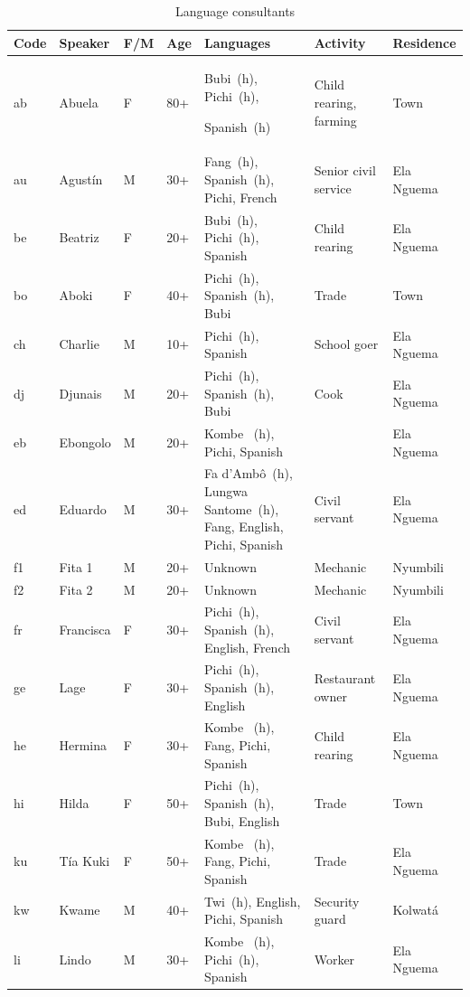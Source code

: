 \begin{longtable}{>{\footnotesize}l@{~}>{\footnotesize}l@{~} >{\footnotesize}l@{~}>{\footnotesize}l >{\footnotesize\raggedright}p{3cm} >{\footnotesize\raggedright}p{2cm} >{\footnotesize}l}
\caption{Language consultants}\label{tab:1:1.1}
\\
\lsptoprule

Code & Speaker & F/M & Age & Languages & Activity & Residence\\
\midrule\endhead
ab & Abuela & \textsc{F} & 80+ & Bubi~(h), Pichi~(h), 

Spanish~(h) & Child rearing, farming & Town\\
au & Agustín & M & 30+ & Fang~(h), Spanish~(h), Pichi, French & Senior civil service & Ela Nguema\\
be & Beatriz & \textsc{F} & 20+ & Bubi~(h), Pichi~(h), Spanish & Child rearing & Ela Nguema\\
bo & Aboki & \textsc{F} & 40+ & Pichi~(h), Spanish~(h), Bubi & Trade & Town\\
ch & Charlie & M & 10+ & Pichi~(h), Spanish & School goer & Ela Nguema\\
dj & Djunais & M & 20+ & Pichi~(h), Spanish~(h), Bubi & Cook & Ela Nguema\\
eb & Ebongolo & M & 20+ & Kombe ~(h), Pichi, Spanish &  & Ela Nguema\\
ed & Eduardo & M & 30+ & Fa d’Ambô~(h), Lungwa Santome~(h), Fang, English, Pichi, Spanish & Civil servant & Ela Nguema\\
f1 & Fita 1 & M & 20+ & Unknown & Mechanic & Nyumbili\\
f2 & Fita 2 & M & 20+ & Unknown & Mechanic & Nyumbili\\
fr & Francisca & \textsc{F} & 30+ & Pichi~(h), Spanish~(h), English, French & Civil servant & Ela Nguema\\
ge & Lage & \textsc{F} & 30+ & Pichi~(h), Spanish~(h), English & Restaurant owner & Ela Nguema\\
he & Hermina & \textsc{F} & 30+ & Kombe ~(h), Fang, Pichi, Spanish & Child rearing & Ela Nguema\\
hi & Hilda & \textsc{F} & 50+ & Pichi~(h), Spanish~(h), Bubi, English & Trade & Town\\
ku & Tía Kuki & \textsc{F} & 50+ & Kombe ~(h), Fang, Pichi, Spanish & Trade & Ela Nguema\\
kw & Kwame & M & 40+ & Twi~(h), English, Pichi, Spanish & Security guard & Kolwatá\\
li & Lindo & M & 30+ & Kombe ~(h), Pichi~(h), Spanish & Worker & Ela Nguema\\

\end{longtable}
